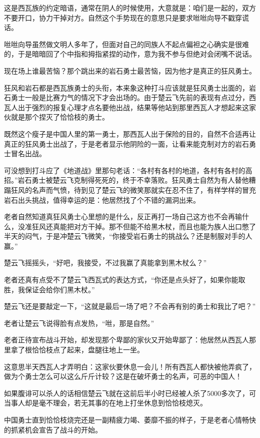 这是西瓦族的约定暗语，通常在阴人的时候使用，大意就是：咱们是一起的，双方不要开口，协力干掉对方。自然这个手势现在的意思只是要求咝咝向导不戳穿谎话。

咝咝向导虽然做文明人多年了，但面对自己的同族人不起点偏袒之心确实是很难的，于是暗暗回了个中指和拇指紧捏的动作，意为我不参与但绝对会闭嘴不说话。

现在场上谁最苦恼？那个跳出来的岩石勇士最苦恼，因为他才是真正的狂风勇士。

狂风和岩石都是西瓦族勇士的头衔，本来象这种打斗应该就是狂风勇士出面的，岩石勇士一般是比赛力气的情况下才会出场的。由于楚云飞先前的表现有点过分，西瓦人出于强烈的报复心理才点名要他出战，结果等他站到那里西瓦人才想起来这家伙就是那个捏灭了恰恰枝的勇士。

既然这个瘦子是中国人里的第一勇士，那西瓦人出于保险的目的，自然不合适再让真正的狂风勇士出战了，于是老者显示他阴险的一面，让看来能克制对方的岩石勇士冒名出战。

可没想到打斗应了《地道战》里那句老话：“各村有各村的地道，各村有各村的高招。”岩石勇士被楚云飞克制得死死的，终于不幸落败。狂风勇士自然为有人替他糟蹋狂风的名声而气愤，待到见了楚云飞的微笑那就实在忍不住了，有样学样的冒充岩石出头挑战，值得幸运的是：他居然找了个不错的漏洞出来。

老者自然知道真狂风勇士心里想的是什么，反正再打一场自己这方也不会再输什么，没准狂风还真能把对方干掉。那不但能不给黑木杖，而且也能为族人出口憋了半天的闷气，于是冲楚云飞微笑，“你接受岩石勇士的挑战么？还是制服对手的人赢。”

楚云飞摇摇头，“好吧，我接受，不过我赢了真能拿到黑木杖么？”

老者还真有点受不了楚云飞西瓦式的表达方式，“你还是点头好了，如果你能取胜，我保证会给你们黑木杖。”

楚云飞还是要敲定一下，“这就是最后一场了吧？不会再有别的勇士和我比了吧？”

老者让楚云飞说得脸有点发热，“咝，那是自然。”

老者正待宣布战斗开始，却发现那个卑鄙的家伙又开始卑鄙了：他居然从西瓦人那里拿了根恰恰枝点了起来，盘腿往地上一坐。

这意思半天西瓦人才弄明白：这家伙要休息一会儿！所有西瓦人都快被他弄疯了，做为个勇士怎么可以这么斤斤计较？这是在破坏勇士的名声，可恶的中国人！

如果腹诽可以杀人的话相信楚云飞就在这前后半小时已经被人杀了5000多次了，可当事人却是毫不理会，若无其事的在地上打坐休息到恰恰枝熄灭。

中国勇士直到恰恰枝烧完还是一副精疲力竭、萎靡不振的样子，于是老者心情畅快的抓紧机会宣告了战斗的开始。


